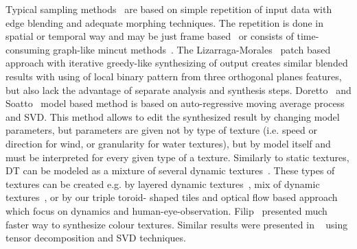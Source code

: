\documentclass{\adsty/acmsiggraph}
\begin{document}
Typical sampling methods~\cite{Schodl00videotextures,Kwatra03graphcuttextures,Phillips03} are based on simple repetition of input data with edge blending and adequate morphing techniques. The repetition is done in spatial or temporal way and may be just frame based~\cite{Schodl00videotextures} or consists of time-consuming graph-like mincut methods~\cite{Kwatra03graphcuttextures}.
The  Lizarraga-Morales~\cite{Lizarraga-Morales14} patch based approach with iterative greedy-like synthesizing of output creates similar blended results with using of local binary pattern from three orthogonal planes features, but also lack the advantage of separate analysis and synthesis steps. 
Doretto~\cite{Dyn_tex_jourmal_dorettoCWS03ijcv} and Soatto~\cite{Dyn_tex_soatto01} model based method is based on  auto-regressive moving average process and SVD. This method allows to edit the synthesized result by changing model parameters, but parameters are given not by type of texture (i.e. speed or direction for wind, or granularity for water textures), but by model itself and must be interpreted for every given type of a texture.
 Similarly to static  textures, DT can be modeled  as a mixture of several dynamic textures~\cite{Chan08modelingclustering,ChanV05:0}. These types of textures can be created e.g. by layered dynamic textures~\cite{Chan06layereddynamic}, mix of dynamic
  textures~\cite{Bar-joseph01texturemixing,ChanV05:0,Chan08modelingclustering}, or by our triple toroid- shaped tiles and optical flow based approach which focus on dynamics and human-eye-observation.
 Filip~\cite{Filip06FastSynthesis} presented much faster way to synthesize colour textures. Similar results were  presented in ~\cite{ChanV05:0,DynTexSynConstantini,Costantini08higherorder} using tensor decomposition and SVD techniques. 
\end{document}
